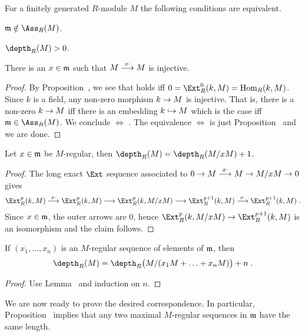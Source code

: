 \documentclass[a4paper,parskip=half,numbers=enddot, DIV=12]{scrreprt}
\begin{document}
\begin{lem}
	For a finitely generated $R$-module $M$ the following conditions are equivalent.
	\begin{alphanumerate}
		\item $\mm\notin\Ass_R(M)$.
		\item $\depth_R(M)>0$.
		\item There is an $x\in \mathfrak{m}$ such that $M\morphism[x\cdot ]M$ is injective.
	\end{alphanumerate}
\end{lem}
\begin{proof}
	By Proposition~, we see that  holds iff $0=\Ext_R^0(k,M)=\Hom_R(k,M)$. Since $k$ is a field, any non-zero morphism $k\morphism M$ is injective. That is, there is a non-zero $k\morphism M$ iff there is an embedding $k\monomorphism M$ which is the case iff $\mm\in\Ass_R(M)$. We conclude  $\Leftrightarrow$ . The equivalence  $\Leftrightarrow$  is just Proposition~ and we are done.
\end{proof}
\begin{lem}
	Let $x\in \mathfrak{m}$ be $M$-regular, then $\depth_R(M)=\depth_R(M/xM)+1$\;.
\end{lem}
\begin{proof}
	The long exact $\Ext$ sequence associated to $0\morphism M\morphism[x\cdot ]M\morphism M/xM\morphism 0$ gives
	\begin{align*}
		\Ext_R^p(k,M)\morphism[x\cdot]\Ext_R^p(k,M)\morphism\Ext_R^p(k,M/xM)\morphism\Ext_R^{p+1}(k,M)\morphism[x\cdot]\Ext_R^{p+1}(k,M)\;.
	\end{align*}
	Since $x\in\mathfrak{m}$, the outer arrows are $0$, hence $\Ext_R^p(k,M/xM)\morphism\Ext_R^{p+1}(k,M)$ is an isomorphism and the claim follows.
\end{proof}
\begin{cor}
	If $(x_1,\ldots,x_n)$ is an $M$-regular sequence of elements of $\mathfrak{m}$, then
	\begin{align*}
		\depth_R(M)=\depth_R\big(M/(x_1M+\ldots+x_nM)\big)+n\;.
	\end{align*}
\end{cor}
\begin{proof}
	Use Lemma~ and induction on $n$.
\end{proof}
We are now ready to prove the desired correspondence. In particular, Proposition~ implies that any two maximal $M$-regular sequences in $\mathfrak{m}$ have the same length.
\end{document}

